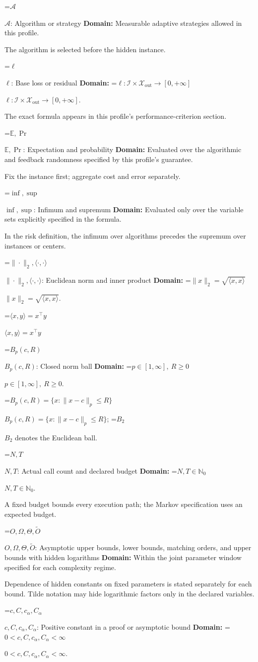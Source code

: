 \documentclass[10pt,a4paper]{article}
\newcommand{\AtlasMath}[1]{\par\begingroup\centering\setbox0=\hbox{$\displaystyle #1$}\ifdim\wd0>1.4\linewidth\typeout{ATLAS WIDE FORMULA: \the\wd0}\fi\ifdim\wd0>\linewidth\resizebox{\linewidth}{!}{\box0}\else\box0\fi\par\endgroup}
\newcommand{\AtlasInlineMath}[1]{\begingroup\setbox0=\hbox{$#1$}\ifdim\wd0>.4\linewidth\endgroup\AtlasMath{#1}\else\endgroup$#1$\fi}
\begin{document}
\AtlasInlineMath{\mathcal{A}}: Algorithm or strategy \textbf{Domain:} Measurable adaptive strategies allowed in this profile.

The algorithm is selected before the hidden instance.

\AtlasInlineMath{\ell}: Base loss or residual \textbf{Domain:} \AtlasInlineMath{\ell:\mathcal{I}\times\mathcal{X}_{\mathrm{out}}\to[0,+\infty]}.

The exact formula appears in this profile's performance-criterion section.

\AtlasInlineMath{\mathbb{E},\Pr}: Expectation and probability \textbf{Domain:} Evaluated over the algorithmic and feedback randomness specified by this profile's guarantee.

Fix the instance first; aggregate cost and error separately.

\AtlasInlineMath{\inf,\sup}: Infimum and supremum \textbf{Domain:} Evaluated only over the variable sets explicitly specified in the formula.

In the risk definition, the infimum over algorithms precedes the supremum over instances or centers.

\AtlasInlineMath{\|\cdot\|_2,\langle\cdot,\cdot\rangle}: Euclidean norm and inner product \textbf{Domain:} \AtlasInlineMath{\|x\|_2=\sqrt{\langle x,x\rangle}}.

\AtlasInlineMath{\langle x,y\rangle=x^\top y}

\AtlasInlineMath{B_p(c,R)}: Closed norm ball \textbf{Domain:} \AtlasInlineMath{p\in[1,\infty],\ R\ge0}.

\AtlasInlineMath{B_p(c,R)=\{x:\|x-c\|_p\le R\}}; \AtlasInlineMath{B_2} denotes the Euclidean ball.

\AtlasInlineMath{N,T}: Actual call count and declared budget \textbf{Domain:} \AtlasInlineMath{N,T\in\mathbb{N}_0}.

A fixed budget bounds every execution path; the Markov specification uses an expected budget.

\AtlasInlineMath{O,\Omega,\Theta,\widetilde{O}}: Asymptotic upper bounds, lower bounds, matching orders, and upper bounds with hidden logarithms \textbf{Domain:} Within the joint parameter window specified for each complexity regime.

Dependence of hidden constants on fixed parameters is stated separately for each bound. Tilde notation may hide logarithmic factors only in the declared variables.

\AtlasInlineMath{c,C,c_\alpha,C_\alpha}: Positive constant in a proof or asymptotic bound \textbf{Domain:} \AtlasInlineMath{0<c,C,c_\alpha,C_\alpha<\infty}.
\end{document}
